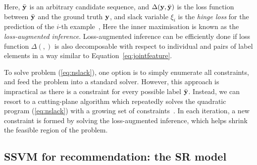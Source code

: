 Here, $\bar{\mathbf{y}}$ is an arbitrary candidate sequence,  %
and $\Delta(\mathbf{y}, \bar{\mathbf{y}})$ is the loss function between $\bar{\mathbf{y}}$ and the ground truth $\mathbf{y}$,
and slack variable $\xi_i$ is the \emph{hinge loss} for the prediction of the $i$-th example~\cite{tsochantaridis2005large},
Here the inner maximisation is known as the \emph{loss-augmented inference}.
Loss-augmented inference can be efficiently done if loss function $\Delta(,)$ is also decomposable
with respect to individual and pairs of label elements in a way similar to Equation~\eqref{eq:jointfeature}.

To solve problem (\ref{eq:nslack}), one option is to simply enumerate all constraints, and feed the problem into a standard solver.
However, this approach is impractical as there is a constraint for every possible label $\bar{\mathbf{y}}$.
Instead, we can resort to a cutting-plane algorithm which repeatedly solves the quadratic program (\ref{eq:nslack})
with a growing set of constraints~\cite{joachims2009predicting}.
In each iteration, a new constraint is formed by solving the loss-augmented inference,
which helps shrink the feasible region of the problem.


\subsection{SSVM for recommendation: the SR model}
\label{ssec:sr}

